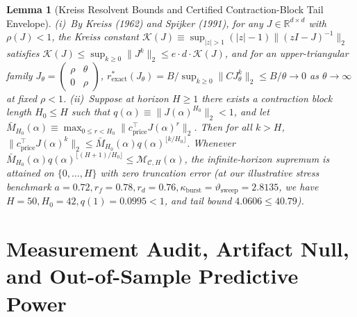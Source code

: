 \documentclass[11pt]{article}
\newtheorem{lemma}[theorem]{Lemma}
\theoremstyle{remark}
\begin{document}
\begin{lemma}[Kreiss Resolvent Bounds and Certified Contraction-Block Tail Envelope]
(i)~By Kreiss (1962) and Spijker (1991), for any $J \in \mathbb{R}^{d \times d}$ with $\rho(J) < 1$, the Kreiss constant $\mathcal{K}(J) \equiv \sup_{|z|>1}(|z|-1)\|(zI-J)^{-1}\|_2$ satisfies $\mathcal{K}(J) \le \sup_{k \ge 0}\|J^k\|_2 \le e \cdot d \cdot \mathcal{K}(J)$, and for an upper-triangular family $J_\theta = \begin{pmatrix}\rho & \theta \\ 0 & \rho\end{pmatrix}$, $r_{\text{exact}}^*(J_\theta) = B / \sup_{k \ge 0}\|C J_\theta^k\|_2 \le B/\theta \to 0$ as $\theta \to \infty$ at fixed $\rho < 1$. (ii)~Suppose at horizon $H \ge 1$ there exists a contraction block length $H_0 \le H$ such that $q(\alpha) \equiv \|J(\alpha)^{H_0}\|_2 < 1$, and let $\bar{M}_{H_0}(\alpha) \equiv \max_{0 \le r < H_0}\|c_{\text{price}}^\top J(\alpha)^r\|_2$. Then for all $k > H$, $\|c_{\text{price}}^\top J(\alpha)^k\|_2 \le \bar{M}_{H_0}(\alpha) q(\alpha)^{\lfloor k/H_0 \rfloor}$. Whenever $\bar{M}_{H_0}(\alpha) q(\alpha)^{\lfloor (H+1)/H_0 \rfloor} \le \mathcal{M}_{\mathcal{C},H}(\alpha)$, the infinite-horizon supremum is attained on $\{0,\dots,H\}$ with zero truncation error (at our illustrative stress benchmark $a=0.72, r_f=0.78, r_d=0.76, \kappa_{\text{burst}}=\vartheta_{\text{sweep}}=2.8135$, we have $H=50, H_0=42, q(1)=0.0995 < 1$, and tail bound $4.0606 \le 40.79$).
\end{lemma}

\section{Measurement Audit, Artifact Null, and Out-of-Sample Predictive Power}
\end{document}
